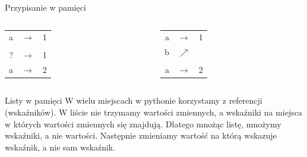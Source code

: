 \begin{frame}{Przypisanie w pamięci}
    \begin{columns}
        \begin{column}{0.4\textwidth}
            
            \begin{table}
                \centering
                \begin{tabular}{rc|c|}
                    \cline{3-3}
                    a & $\longrightarrow$ & 1 \\
                    \cline{3-3}
                    \\
                    \cline{3-3}
                    ? & $\longrightarrow$ & 1 \\
                    \cline{3-3}
                    a & $\longrightarrow$ & 2 \\
                    \cline{3-3}
                \end{tabular}
            \end{table}
        \end{column}
        \begin{column}{0.4\textwidth}
            
            \begin{table}
                \centering
                \begin{tabular}{rc|c|}
                    \cline{3-3}
                    a & $\longrightarrow$ & 1 \\
                    \cline{3-3}
                    b & \multicolumn{1}{c}{$\nearrow$} & \multicolumn{1}{c}{} \\
                    \\
                    \cline{3-3}
                    a & $\longrightarrow$ & 2 \\
                    \cline{3-3}
                \end{tabular}
            \end{table}
        \end{column}
    \end{columns}
\end{frame}

\begin{frame}{Listy w pamięci}
    W wielu miejscach w pythonie korzystamy z referencji (wskaźników). W liście nie trzymamy wartości zmiennych, a wskaźniki na miejsca w których wartości zmiennych się znajdują. Dlatego mnożąc listę, mnożymy wskaźniki, a nie wartości. Następnie zmieniamy wartość na którą wskazuje wskaźnik, a nie sam wskaźnik.
    
\end{frame}

